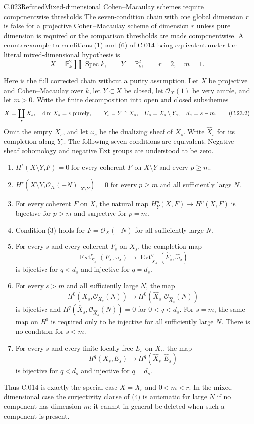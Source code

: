 \begin{saresult}{C.023}{Refuted}{Mixed-dimensional Cohen--Macaulay schemes require componentwise thresholds}
The seven-condition chain with one global dimension $r$ is false for
a projective Cohen--Macaulay scheme of dimension $r$ unless pure
dimension is required or the comparison thresholds are made
componentwise. A counterexample to conditions (1) and (6) of C.014
being equivalent under the literal mixed-dimensional hypothesis is
\[
 X=\mathbb P_k^2\amalg\operatorname{Spec}k,\qquad
 Y=\mathbb P_k^2,\qquad r=2,\quad m=1.
                                                        \tag{C.23.1}
\]

Here is the full corrected chain without a purity assumption.
Let $X$ be projective and Cohen--Macaulay over $k$, let $Y\subset X$
be closed, let $\mathcal O_X(1)$ be very ample, and let $m>0$.
Write the finite decomposition into open and closed subschemes
\[
 X=\coprod_sX_s,\quad \dim X_s=s\ \hbox{purely},\qquad
 Y_s=Y\cap X_s,\quad U_s=X_s\setminus Y_s,\quad d_s=s-m.
                                                        \tag{C.23.2}
\]
Omit the empty $X_s$, and let $\omega_s$ be the dualizing sheaf of
$X_s$. Write $\widehat X_s$ for its completion along $Y_s$.
The following seven conditions are equivalent. Negative sheaf
cohomology and negative Ext groups are understood to be zero.
\begin{enumerate}
\item $H^p(X\setminus Y,F)=0$ for every coherent $F$ on $X\setminus Y$
and every $p\ge m$.
\item $H^p(X\setminus Y,\mathcal O_X(-N)|_{X\setminus Y})=0$ for every
$p\ge m$ and all sufficiently large $N$.
\item For every coherent $F$ on $X$, the natural map
$H_Y^p(X,F)\to H^p(X,F)$ is bijective for $p>m$ and surjective for $p=m$.
\item Condition (3) holds for $F=\mathcal O_X(-N)$ for all sufficiently
large $N$.
\item For every $s$ and every coherent $F_s$ on $X_s$, the completion map
\[
 \operatorname{Ext}_{X_s}^q(F_s,\omega_s)\longrightarrow
 \operatorname{Ext}_{\widehat X_s}^q(\widehat F_s,\widehat\omega_s)
\]
is bijective for $q<d_s$ and injective for $q=d_s$.
\item For every $s>m$ and all sufficiently large $N$, the map
\[
 H^0(X_s,\mathcal O_{X_s}(N))\longrightarrow
 H^0(\widehat X_s,\mathcal O_{\widehat X_s}(N))
\]
is bijective and
$H^q(\widehat X_s,\mathcal O_{\widehat X_s}(N))=0$ for $0<q<d_s$.
For $s=m$, the same map on $H^0$ is required only to be injective
for all sufficiently large $N$. There is no condition for $s<m$.
\item For every $s$ and every finite locally free $E_s$ on $X_s$, the map
\[
 H^q(X_s,E_s)\longrightarrow
 H^q(\widehat X_s,\widehat E_s)
\]
is bijective for $q<d_s$ and injective for $q=d_s$.
\end{enumerate}
Thus C.014 is exactly the special case $X=X_r$ and $0<m<r$.
In the mixed-dimensional case the surjectivity clause of (4)
is automatic for large $N$ if no component has dimension $m$;
it cannot in general be deleted when such a component is present.
\end{saresult}
